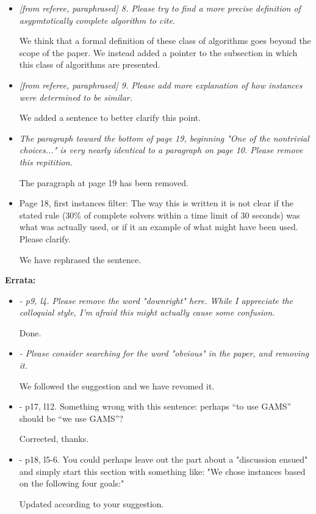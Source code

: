 \documentclass[11pt]{article}
\newcommand{\rep}[1]{{\textcolor{acblue}{#1}}}
\begin{document}
\begin{itemize}
\item 
{\it
[from referee, paraphrased] 8. Please try to find a more precise definition of asypmtotically complete algorithm to 
cite.
} 

\rep{We think that a formal definition of these class of algorithms goes beyond the scope of the paper. We instead added a pointer to the subsection in which this class of algorithms are presented.}

\item 
{\it
[from referee, paraphrased] 9. Please add more explanation of how instances were determined to be similar. 
}

\rep{We added a sentence to better clarify this point.}


\item 
{\it
The paragraph toward the bottom of page 19, beginning "One of the nontrivial choices..." is very nearly identical to a paragraph on page 10. Please remove this repitition. 
}

\rep{The paragraph at page 19 has been removed.}


\item Page 18, first instances filter: The way this is written it is not clear if the stated rule (30\% of complete solvers within a time limit of 30 seconds) was what was actually used, or if it an example of what might have been used. Please clarify. 

\rep{We have rephrased the sentence.}

 
\end{itemize}

\bigskip
\textbf{Errata:}

 \begin{itemize}
 
\item 
{\it
- p9, l4. Please remove the word "downright" here. While I appreciate the colloquial style, I'm afraid this might actually cause some confusion. 
}

\rep{Done.}

\item 
{\it
- Please consider searching for the word "obvious" in the paper, and removing it. 
}

\rep{We followed the suggestion and we have revomed it.}

\item 
{\it

- p17, l12. Something wrong with this sentence: perhaps ``to use GAMS'' should be ``we use GAMS''? 
}

\rep{Corrected, thanks.}

\item 
{\it

- p18, l5-6. You could perhaps leave out the part about a "discussion ensued" and simply start this section with something like: "We chose instances based on the following four goals:" 
}

\rep{Updated according to your suggestion.}

 
\end{itemize}
\end{document}

